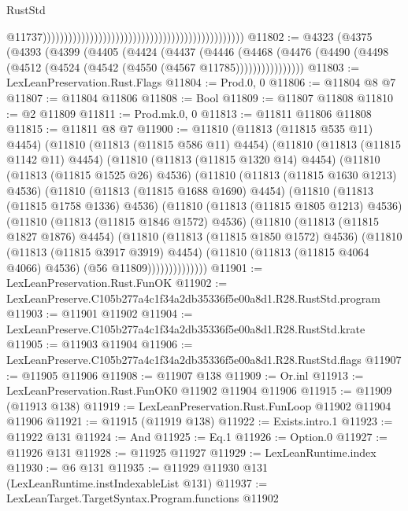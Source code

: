\begin{lexlean}{RustStd}
\begin{coremodule}
                                                                                                  @11737)))))))))))))))))))))))))))))))))))))))))))))))
@11802 := @4323
    (@4375
      (@4393
        (@4399
          (@4405
            (@4424
              (@4437
                (@4446
                  (@4468
                    (@4476 (@4490 (@4498 (@4512 (@4524 (@4542 (@4550 (@4567 @11785))))))))))))))))
@11803 := LexLeanPreservation.Rust.Flags
@11804 := Prod.{0, 0}
@11806 := @11804 @8 @7
@11807 := @11804 @11806
@11808 := Bool
@11809 := @11807 @11808
@11810 := @2 @11809
@11811 := Prod.mk.{0, 0}
@11813 := @11811 @11806 @11808
@11815 := @11811 @8 @7
@11900 := @11810
    (@11813 (@11815 @535 @11) @4454)
    (@11810
      (@11813 (@11815 @586 @11) @4454)
      (@11810
        (@11813 (@11815 @1142 @11) @4454)
        (@11810
          (@11813 (@11815 @1320 @14) @4454)
          (@11810
            (@11813 (@11815 @1525 @26) @4536)
            (@11810
              (@11813 (@11815 @1630 @1213) @4536)
              (@11810
                (@11813 (@11815 @1688 @1690) @4454)
                (@11810
                  (@11813 (@11815 @1758 @1336) @4536)
                  (@11810
                    (@11813 (@11815 @1805 @1213) @4536)
                    (@11810
                      (@11813 (@11815 @1846 @1572) @4536)
                      (@11810
                        (@11813 (@11815 @1827 @1876) @4454)
                        (@11810
                          (@11813 (@11815 @1850 @1572) @4536)
                          (@11810
                            (@11813 (@11815 @3917 @3919) @4454)
                            (@11810 (@11813 (@11815 @4064 @4066) @4536) (@56 @11809))))))))))))))
@11901 := LexLeanPreservation.Rust.FunOK
@11902 := LexLeanPreserve.C105b277a4c1f34a2db35336f5e00a8d1.R28.RustStd.program
@11903 := @11901 @11902
@11904 := LexLeanPreserve.C105b277a4c1f34a2db35336f5e00a8d1.R28.RustStd.krate
@11905 := @11903 @11904
@11906 := LexLeanPreserve.C105b277a4c1f34a2db35336f5e00a8d1.R28.RustStd.flags
@11907 := @11905 @11906
@11908 := @11907 @138
@11909 := Or.inl
@11913 := LexLeanPreservation.Rust.FunOK0 @11902 @11904 @11906
@11915 := @11909 (@11913 @138)
@11919 := LexLeanPreservation.Rust.FunLoop @11902 @11904 @11906
@11921 := @11915 (@11919 @138)
@11922 := Exists.intro.{1}
@11923 := @11922 @131
@11924 := And
@11925 := Eq.{1}
@11926 := Option.{0}
@11927 := @11926 @131
@11928 := @11925 @11927
@11929 := LexLeanRuntime.index
@11930 := @6 @131
@11935 := @11929 @11930 @131 (LexLeanRuntime.instIndexableList @131)
@11937 := LexLeanTarget.TargetSyntax.Program.functions @11902

\end{coremodule}
\end{lexlean}
